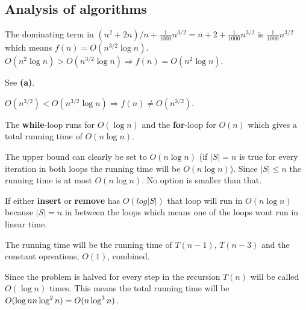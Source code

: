 \documentclass[a4paper]{article}
\newenvironment{task}[1]
{
	\begin{description}[align=right]
		\item [#1]
}{		%
	\end{description}
}
\newcommand{\abs}[1]{\left|#1\right|}
\newcommand{\taskref}[1]{\textbf{#1}}
\let\*\relax
\DeclareMathOperator{\*}{\cdot}
\begin{document}
\subsection*{Analysis of algorithms}

\begin{task}{1. (a)}
	 The dominating term in $(n^2+2n)/n+\frac{1}{1000}n^{3/2}=n+2+\frac{1}{1000}n^{3/2}$ is $\frac{1}{1000}n^{3/2}$ which means $f(n)=O(n^{3/2}\log n)$. $O(n^2\log n)>O(n^{3/2}\log n) \Rightarrow f(n)=O(n^2\log n)$.
\end{task}

\begin{task}{(b)}
 See \taskref{(a)}.
\end{task}

\begin{task}{(c)}
	 $O(n^{3/2})<O(n^{3/2}\log n) \Rightarrow f(n)\neq O(n^{3/2})$.
\end{task}

\begin{task}{2. (a)}
	 The \textbf{while}-loop runs for $O(\log n)$ and the \textbf{for}-loop for $O(n)$ which gives a total running time of $O(n\log n)$.
\end{task}

\begin{task}{3. (a)}
	 The upper bound can clearly be set to $O(n\log n)$ (if $\abs{S}=n$ is true for every iteration in both loops the running time will be $O(n\log n)$). Since $\abs{S}\leq n$ the running time is at most $O(n\log n)$. No option is smaller than that.
\end{task}

\begin{task}{(b)}
	 If either \textbf{insert} or \textbf{remove} has $O(log\abs{S})$ that loop will run in $O(n\log n)$ because $\abs{S}=n$ in between the loops which means one of the loops wont run in linear time.
\end{task}

\begin{task}{4. (a)}
	 The running time will be the running time of $T(n-1)$, $T(n-3)$ and the constant opreations, $O(1)$, combined.
\end{task}

\begin{task}{(b)}
\end{task}

\begin{task}{(c)}
	 Since the problem is halved for every step in the recursion $T(n)$ will be called $O(\log n)$ times. This means the total running time will be $O(\log n \* n\log^2 n)=O(n\log^3 n)$.
\end{task}
\end{document}
